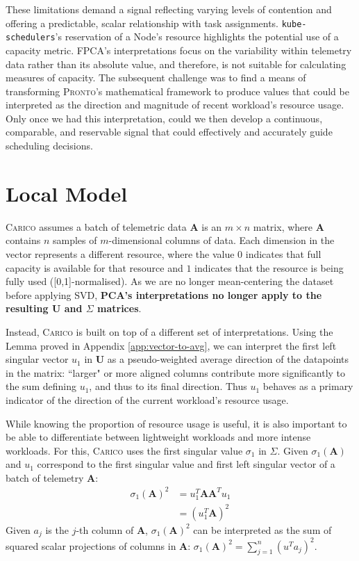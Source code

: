 These limitations demand a signal reflecting varying levels of contention
and offering a predictable, scalar relationship with task assignments.
\texttt{kube-schedulers}'s reservation of a Node's resource highlights the
potential use of a capacity metric. FPCA's interpretations focus on the
variability within telemetry data rather than its absolute value, and therefore,
is not suitable for calculating measures of capacity. The subsequent
challenge was to find a means of transforming \textsc{Pronto}'s mathematical
framework to produce values that could be interpreted as the direction and
magnitude of recent workload's resource usage. Only once we had this
interpretation, could we then develop a continuous, comparable, and reservable
signal that could effectively and accurately guide scheduling decisions.

\section{Local Model}
\label{sec:local-model-construction}
\textsc{Carico} assumes a batch of telemetric data $\mathbf{A}$ is an $m \times
n$ matrix, where $\mathbf{A}$ contains $n$ samples of $m$-dimensional columns of
data. Each dimension in the vector represents a different resource, where the
value $0$ indicates that full capacity is available for that resource and $1$
indicates that the resource is being fully used ([0,1]-normalised). As we
are no longer mean-centering the dataset before applying SVD, \textbf{PCA's
interpretations no longer apply to the resulting $\mathbf{U}$ and $\Sigma$
matrices}.

Instead, \textsc{Carico} is built on top of  a different set of interpretations.
Using the Lemma proved in Appendix \ref{app:vector-to-avg}, we can interpret the
first left singular vector $u_1$ in $\mathbf{U}$ as a pseudo-weighted average
direction of the datapoints in the matrix: ``larger" or more aligned columns
contribute more significantly to the sum defining $u_1$, and thus to its final
direction. Thus $u_1$ behaves as a primary indicator of the direction of the
current workload's resource usage.

While knowing the proportion of resource usage is useful, it is also important
to be able to differentiate between lightweight workloads and more intense
workloads. For this, \textsc{Carico} uses the first singular value $\sigma_1$ in
$\Sigma$. Given $\sigma_1(\mathbf{A})$ and $u_1$ correspond to the first
singular value and first left singular vector of a batch of telemetry
$\mathbf{A}$:
\begin{align}
    \sigma_1(\mathbf{A})^2 &= u_1^T \mathbf{AA}^T u_1 \\
    &= (u_1^T \mathbf{A})^2
\end{align}
Given $a_j$ is the $j$-th column of $\mathbf{A}$, $\sigma_1(\mathbf{A})^2$ can be
interpreted as the sum of squared scalar projections of columns in $\mathbf{A}$:
$\sigma_1(\mathbf{A})^2 = \sum_{j=1}^n (u^T a_j)^2$.


